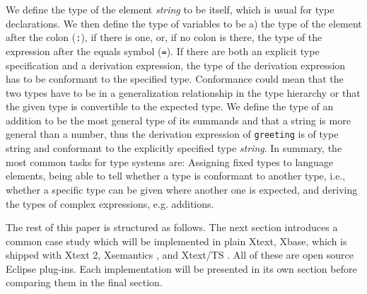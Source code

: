 We define the type of the element \emph{string} to be itself, which is usual for
type declarations. We then define the type of variables to be a) the type of the
element after the colon (\verb|:|), if there is one, or, if no colon is there,
the type of the expression after the equals symbol (\verb|=|).
If there are both an explicit type specification and a derivation expression,
the type of the derivation expression has to be conformant to the specified
type. Conformance could mean that the two types have to be in a generalization
relationship in the type hierarchy or that the given type is convertible to the
expected type. We define the type of an addition to be the most general type of
its summands and that a string is more general than a number, thus the
derivation expression  of \verb|greeting| is of type string and conformant to
the explicitly specified type \emph{string}. In summary, the most common
tasks for type systems are:
Assigning fixed types to language elements, being able to tell whether a
type is conformant to another type, i.e., whether a specific type can be given
where another one is expected, and deriving the types of complex expressions, e.g.
additions.

The rest of this paper is structured as follows. The next section introduces a
common case study which will be implemented in plain Xtext, Xbase, which is
shipped with Xtext 2, Xsemantics \cite{lbts}, and Xtext/TS \cite{mvts}. All of
these are open source Eclipse plug-ins. Each implementation will be presented in
its own section before comparing them in the final section.
